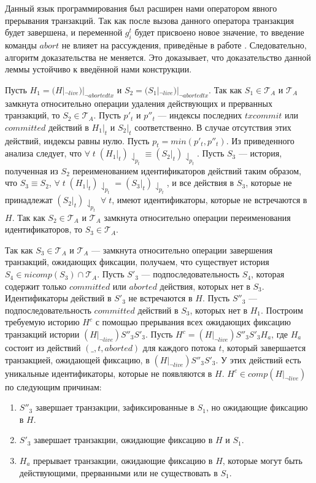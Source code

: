 \begin{myproof}
Данный язык программирования был расширен нами оператором явного прерывания транзакций. Так как после вызова данного оператора транзакция будет завершена, и переменной $g^t_i$ будет присвоено новое значение, то введение команды $abort$ не влияет на рассуждения, приведёные в работе \cite{tms_article}. Следовательно, алгоритм доказательства не меняется. Это доказывает, что доказательство данной леммы устойчиво к введённой нами конструкции.

Пусть $H_1 = (H|_{\neg live})|_{\neg abortedtx}$ и $S_2 = (S_1|_{\neg live})|_{\neg abortedtx}$. Так как $S_1 \in \mathcal{T}_A$ и $\mathcal{T}_A$ замкнута относительно операции удаления действующих и прерванных транзакций, то $S_2 \in \mathcal{T}_A$. Пусть $p'_t$ и $p''_t$ --- индексы последних $txcommit$ или $committed$ действий в $H_1|_t$ и $S_2|_t$ соответственно. В случае отсутствия этих действий, индексы равны нулю. Пусть $p_t=min(p'_t,p''_t)$. Из приведенного анализа следует, что $\forall \; t \; (H_1|_t)\downharpoonleft_{p_t} \equiv (S_2|_t)\downharpoonleft_{p_t}$. Пусть $S_3$ --- история, полученная из $S_2$ переименованием идентификаторов действий таким образом, что $S_3 \equiv S_2$, $\forall \; t \; (H_1|_t)\downharpoonleft_{p_t} = (S_3|_t)\downharpoonleft_{p_t}$, и все действия в $S_3$, которые не принадлежат $(S_2|_t)\downharpoonleft_{p_t} \; \forall \; t$, имеют идентификаторы, которые не встречаются в $H$. Так как $S_2 \in \mathcal{T}_A$ и $\mathcal{T}_A$ замкнута относительно операции переименования идентификаторов, то $S_3 \in \mathcal{T}_A$.

Так как $S_3 \in \mathcal{T}_A$ и $\mathcal{T}_A$ --- замкнута относительно операции завершения транзакций, ожидающих фиксации, получаем, что существует история $S_4 \in nicomp(S_3) \cap \mathcal{T}_A$. Пусть $S'_3$ --- подпоследовательность $S_4$, которая содержит только $committed$ или $aborted$ действия, которых нет в $S_3$. Идентификаторы действий в $S'_3$ не встречаются в $H$. Пусть $S''_3$ --- подпоследовательность $committed$ действий в $S_3$, которых нет в $H_1$. Построим требуемую историю $H^c$ с помощью прерывания всех ожидающих фиксацию транзакций истории $(H|_{\neg live})S''_3S'_3$. Пусть $H^c = (H|_{\neg live})S''_3S'_3H_a$, где $H_a$ состоит из действий $(\_, t, aborted)$ для каждого потока $t$, который завершается транзакцией, ожидающей фиксацию, в $(H|_{\neg live})S''_3S'_3$. У этих действий есть уникальные идентификаторы, которые не появляются в $H$. $H^c \in comp(H|_{\neg live})$ по следующим причинам: 
\begin{enumerate}[label=(\roman*)]
\item $S''_3$ завершает транзакции, зафиксированные в $S_1$, но ожидающие фиксацию в $H$.  
\item $S'_3$ завершает транзакции, ожидающие фиксацию в $H$ и $S_1$.
\item $H_a$ прерывает транзакции, ожидающие фиксацию в $H$, которые могут быть действующими, прерванными или не существовать в $S_1$.
\end{enumerate}


\end{myproof}
